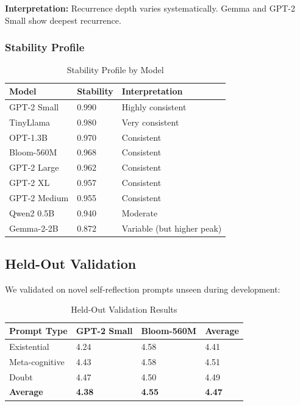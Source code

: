 \documentclass[12pt,a4paper]{article}
\begin{document}
\textbf{Interpretation:} Recurrence depth varies systematically. Gemma and GPT-2 Small show deepest recurrence.

\subsubsection{Stability Profile}

\begin{table}[h]
\centering
\caption{Stability Profile by Model}
\begin{tabular}{lll}
\toprule
\textbf{Model} & \textbf{Stability} & \textbf{Interpretation} \\
\midrule
GPT-2 Small & 0.990 & Highly consistent \\
TinyLlama & 0.980 & Very consistent \\
OPT-1.3B & 0.970 & Consistent \\
Bloom-560M & 0.968 & Consistent \\
GPT-2 Large & 0.962 & Consistent \\
GPT-2 XL & 0.957 & Consistent \\
GPT-2 Medium & 0.955 & Consistent \\
Qwen2 0.5B & 0.940 & Moderate \\
Gemma-2-2B & 0.872 & Variable (but higher peak) \\
\bottomrule
\end{tabular}
\end{table}

\subsection{Held-Out Validation}

We validated on novel self-reflection prompts unseen during development:

\begin{table}[h]
\centering
\caption{Held-Out Validation Results}
\begin{tabular}{llll}
\toprule
\textbf{Prompt Type} & \textbf{GPT-2 Small} & \textbf{Bloom-560M} & \textbf{Average} \\
\midrule
Existential & 4.24 & 4.58 & 4.41 \\
Meta-cognitive & 4.43 & 4.58 & 4.51 \\
Doubt & 4.47 & 4.50 & 4.49 \\
\midrule
\textbf{Average} & \textbf{4.38} & \textbf{4.55} & \textbf{4.47} \\
\bottomrule
\end{tabular}
\end{table}
\end{document}
